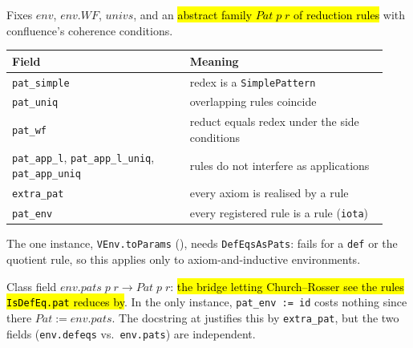 \begin{definition}
\label{class:cr-params}
\leanok
{}

 Fixes $env$, $env.WF$, $univs$, and an \hl{abstract family $Pat\;p\;r$ of
reduction rules} with confluence's coherence conditions.
\par\smallskip\noindent
\begin{tabular}{p{0.44\linewidth}p{0.49\linewidth}}
\toprule
Field & Meaning \\
\midrule
\texttt{pat\_simple} & redex is a \texttt{SimplePattern} \\
\texttt{pat\_uniq} & overlapping rules coincide \\
\texttt{pat\_wf} & reduct equals redex under the side conditions \\
\texttt{pat\_app\_l}, \texttt{pat\_app\_l\_uniq}, \texttt{pat\_app\_uniq} & rules do not
interfere as applications \\
\texttt{extra\_pat} & every axiom is realised by a rule \\
\texttt{pat\_env} & every registered rule is a rule (\texttt{iota}) \\
\bottomrule
\end{tabular}\par\smallskip
{} The one instance, \texttt{VEnv.toParams}
(), needs \texttt{DefEqsAsPats}: fails
for a \texttt{def} or the quotient rule, so this applies only to axiom-and-inductive
environments.
\end{definition}

\begin{definition}
\label{axiom:cr-params-pat-env}
\leanok
{}

 Class field $env.pats\;p\;r\to Pat\;p\;r$: \hl{the bridge letting
Church--Rosser see the rules \texttt{IsDefEq.pat} reduces by}. In the only instance,
\texttt{pat\_env := id} costs nothing since there $Pat:=env.pats$.
 The docstring at  justifies
this by \texttt{extra\_pat}, but the two fields (\texttt{env.defeqs} vs.\ \texttt{env.pats}) are
independent.
\end{definition}

